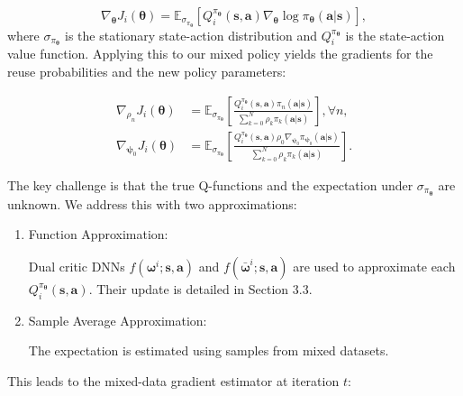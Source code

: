 \documentclass{IEEEtran}
\begin{document}
\[
\nabla_{\boldsymbol{\theta}}J_{i}(\boldsymbol{\theta})=\mathbb{E}_{\sigma_{\pi_{\boldsymbol{\theta}}}}\left[Q_{i}^{\pi_{\boldsymbol{\theta}}}(\boldsymbol{s},\boldsymbol{a})\nabla_{\boldsymbol{\theta}}\log\pi_{\boldsymbol{\theta}}(\boldsymbol{a}|\boldsymbol{s})\right],
\]
where $\sigma_{\pi_{\boldsymbol{\theta}}}$ is the stationary state-action distribution and $Q_{i}^{\pi_{\boldsymbol{\theta}}}$ is the state-action value function. Applying this to our mixed policy yields the gradients for the reuse probabilities and the new policy parameters:

\[
\begin{aligned}\nabla_{\rho_{n}}J_{i}(\boldsymbol{\theta}) & =\mathbb{E}_{\sigma_{\pi_{\boldsymbol{\theta}}}}\left[\frac{Q_{i}^{\pi_{\boldsymbol{\theta}}}(\boldsymbol{s},\boldsymbol{a})\pi_{n}(\boldsymbol{a}|\boldsymbol{s})}{\sum_{k=0}^{N}\rho_{k}\pi_{k}(\boldsymbol{a}|\boldsymbol{s})}\right],\forall n,\\
\nabla_{\boldsymbol{\psi}_{0}}J_{i}(\boldsymbol{\theta}) & =\mathbb{E}_{\sigma_{\pi_{\boldsymbol{\theta}}}}\left[\frac{Q_{i}^{\pi_{\boldsymbol{\theta}}}(\boldsymbol{s},\boldsymbol{a})\rho_{0}\nabla_{\boldsymbol{\psi}_{0}}\pi_{\boldsymbol{\psi}_{0}}(\boldsymbol{a}|\boldsymbol{s})}{\sum_{k=0}^{N}\rho_{k}\pi_{k}(\boldsymbol{a}|\boldsymbol{s})}\right].
\end{aligned}
\]

The key challenge is that the true Q-functions and the expectation under $\sigma_{\pi_{\boldsymbol{\theta}}}$ are unknown. We address this with two approximations:

\begin{enumerate}
\item Function Approximation:

Dual critic DNNs $f(\boldsymbol{\omega}^{i};\boldsymbol{s},\boldsymbol{a})$ and $f(\bar{\boldsymbol{\omega}}^{i};\boldsymbol{s},\boldsymbol{a})$ are used to approximate each $Q_{i}^{\pi_{\boldsymbol{\theta}}}(\boldsymbol{s},\boldsymbol{a})$. Their update is detailed in Section 3.3.
\item Sample Average Approximation:

The expectation is estimated using samples from mixed datasets.
\end{enumerate}

This leads to the mixed-data gradient estimator at iteration $t$:
\end{document}
